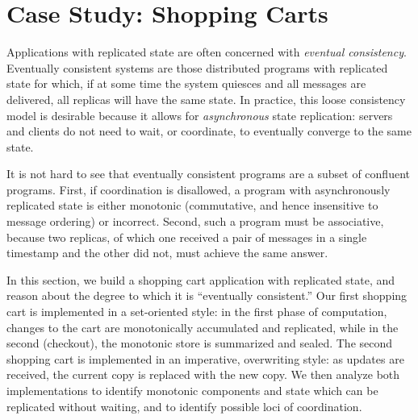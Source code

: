 \section{Case Study: Shopping Carts}
Applications with replicated state are often concerned with {\em eventual
consistency}.  
Eventually consistent systems are those distributed programs with replicated state for which,
if at some time the system quiesces and all 
messages are delivered, all replicas will have the same state.
In practice, this loose consistency model is desirable because it allows for \emph{asynchronous}
state replication: servers and clients do not
need to wait, or coordinate, to eventually converge to the same state.

%

It is not hard to see that eventually consistent programs are a subset of
confluent programs.  First, if coordination is disallowed, 
a program with asynchronously replicated state is either monotonic (commutative, and hence
insensitive to message ordering)
or incorrect.  Second, such a program must be
associative, because two replicas, of which one received a pair of messages in
a single timestamp and the other did not, must achieve the same answer.

In this section, we build a shopping cart application with replicated state,
and reason about the degree to which it is ``eventually consistent.''  Our first 
shopping cart is implemented in a set-oriented style: in the first phase of computation,
changes to the cart are monotonically accumulated and replicated, while in the second
(checkout), the monotonic store is summarized and sealed.  The second shopping cart
is implemented in an imperative, overwriting style: as updates are received, the current copy 
is replaced with the new copy.  We then analyze both implementations to identify monotonic 
components and state which can be replicated without waiting, and to identify possible
loci of coordination.




